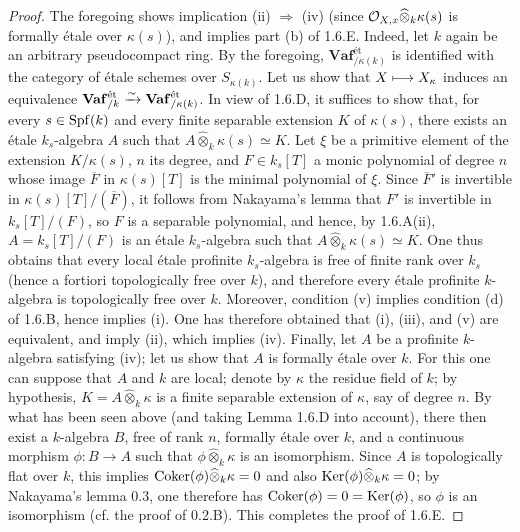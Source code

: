 \begin{proof}
The foregoing shows implication (ii) $\Rightarrow$ (iv) (since $\mathcal{O}_{X,x}\widehat\otimes_k\kappa(s)$ is formally étale over $\kappa(s)$), and implies part (b) of 1.6.E. Indeed, let $k$ again be an arbitrary pseudocompact ring. By the foregoing, $\mathbf{Vaf}_{/\kappa(k)}^{\text{ét}}$ is identified with the category of étale schemes over $S_{\kappa(k)}$. Let us show that $X\longmapsto X_\kappa$ induces an equivalence $\mathbf{Vaf}_{/k}^{\text{ét}}\xrightarrow{\sim}\mathbf{Vaf}_{/\kappa(k)}^{\text{ét}}$. In view of 1.6.D, it suffices to show that, for every $s\in\operatorname{Spf}(k)$ and every finite separable extension $K$ of $\kappa(s)$, there exists an étale $k_s$-algebra $A$ such that $A\widehat\otimes_k\kappa(s)\simeq K$. Let $\xi$ be a primitive element of the extension $K/\kappa(s)$, $n$ its degree, and $F\in k_s[T]$ a monic polynomial of degree $n$ whose image $\overline F$ in $\kappa(s)[T]$ is the minimal polynomial of $\xi$. Since $\overline F'$ is invertible in $\kappa(s)[T]/(\overline F)$, it follows from Nakayama's lemma that $F'$ is invertible in $k_s[T]/(F)$, so $F$ is a separable polynomial, and hence, by 1.6.A(ii), $A=k_s[T]/(F)$ is an étale $k_s$-algebra such that $A\widehat\otimes_k\kappa(s)\simeq K$. One thus obtains that every local étale profinite $k_s$-algebra is free of finite rank over $k_s$ (hence a fortiori topologically free over $k$), and therefore every étale profinite $k$-algebra is topologically free over $k$.
Moreover, condition (v) implies condition (d) of 1.6.B, hence implies (i). One has therefore obtained that (i), (iii), and (v) are equivalent, and imply (ii), which implies (iv). Finally, let $A$ be a profinite $k$-algebra satisfying (iv); let us show that $A$ is formally étale over $k$. For this one can suppose that $A$ and $k$ are local; denote by $\kappa$ the residue field of $k$; by hypothesis, $K=A\widehat\otimes_k\kappa$ is a finite separable extension of $\kappa$, say of degree $n$. By what has been seen above (and taking Lemma 1.6.D into account), there then exist a $k$-algebra $B$, free of rank $n$, formally étale over $k$, and a continuous morphism $\phi:B\to A$ such that $\phi\widehat\otimes_k\kappa$ is an isomorphism. Since $A$ is topologically flat over $k$, this implies $\operatorname{Coker}(\phi)\widehat\otimes_k\kappa=0$ and also $\operatorname{Ker}(\phi)\widehat\otimes_k\kappa=0$; by Nakayama's lemma 0.3, one therefore has $\operatorname{Coker}(\phi)=0=\operatorname{Ker}(\phi)$, so $\phi$ is an isomorphism (cf. the proof of 0.2.B). This completes the proof of 1.6.E.
\end{proof}
